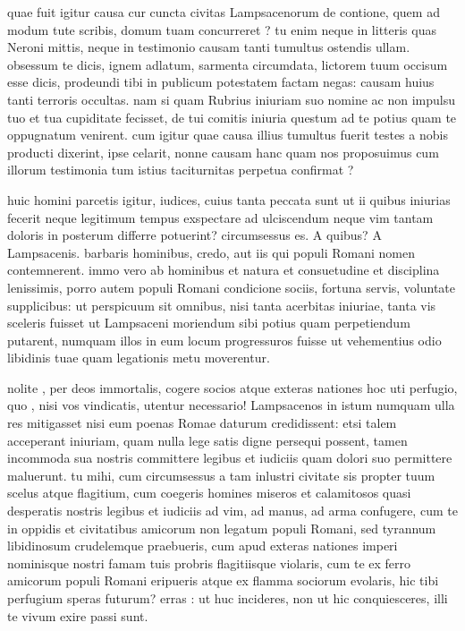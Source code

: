  quae fuit igitur causa cur cuncta civitas Lampsacenorum de contione, quem ad modum tute scribis, domum tuam concurreret ? tu enim neque in litteris quas Neroni mittis, neque in testimonio causam tanti tumultus ostendis ullam. obsessum te dicis, ignem adlatum, sarmenta circumdata, lictorem tuum occisum esse dicis, prodeundi tibi in publicum potestatem factam negas: causam huius tanti terroris occultas. nam si quam Rubrius iniuriam suo nomine ac non impulsu tuo et tua cupiditate fecisset, de tui comitis iniuria questum ad te potius quam te oppugnatum venirent. cum igitur quae causa illius tumultus fuerit testes a nobis producti dixerint, ipse celarit, nonne causam hanc quam nos proposuimus cum illorum testimonia tum istius taciturnitas perpetua confirmat ?

 huic homini parcetis igitur, iudices, cuius tanta peccata sunt ut ii quibus iniurias fecerit neque legitimum tempus exspectare ad ulciscendum neque vim tantam doloris in posterum differre potuerint? circumsessus es. A quibus? A Lampsacenis. barbaris hominibus, credo, aut iis qui populi Romani nomen contemnerent. immo vero ab hominibus et natura et consuetudine et disciplina lenissimis, porro autem populi Romani condicione sociis, fortuna servis, voluntate supplicibus: ut perspicuum sit omnibus, nisi tanta acerbitas iniuriae, tanta vis sceleris fuisset ut Lampsaceni moriendum sibi potius quam perpetiendum putarent, numquam illos in eum locum progressuros fuisse ut vehementius odio libidinis tuae quam legationis metu moverentur.

 nolite , per deos immortalis, cogere socios atque exteras nationes hoc uti perfugio, quo , nisi vos vindicatis, utentur necessario! Lampsacenos in istum numquam ulla res mitigasset nisi eum poenas Romae daturum credidissent: etsi talem acceperant iniuriam, quam nulla lege satis digne persequi possent, tamen incommoda sua nostris committere legibus et iudiciis quam dolori suo permittere maluerunt. tu mihi, cum circumsessus a tam inlustri civitate sis propter tuum scelus atque flagitium, cum coegeris homines miseros et calamitosos quasi desperatis nostris legibus et iudiciis ad vim, ad manus, ad arma confugere, cum te in oppidis et civitatibus amicorum non legatum populi Romani, sed tyrannum libidinosum crudelemque praebueris, cum apud exteras nationes imperi nominisque nostri famam tuis probris flagitiisque violaris, cum te ex ferro amicorum populi Romani eripueris atque ex flamma sociorum evolaris, hic tibi perfugium speras futurum? erras : ut huc incideres, non ut hic conquiesceres, illi te vivum exire passi sunt.

